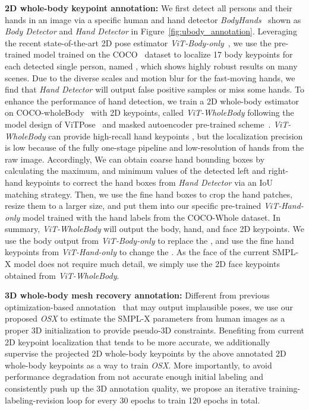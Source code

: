 \documentclass[10pt,twocolumn,letterpaper]{article}
\newcommand{\modelname}{\emph{OSX}\xspace}
\begin{document}
\noindent \textbf{2D whole-body keypoint annotation:} 
We first detect all persons and their hands in an image via a specific human and hand detector \emph{BodyHands}~\cite{narasimhaswamy2022bodyhands} shown as \emph{Body Detector} and \emph{Hand Detector} in Figure~\ref{fig:ubody_annotation}.
Leveraging the recent state-of-the-art 2D pose estimator \emph{ViT-Body-only}~\cite{YufeiXu2022ViTPoseSV}, we use the pre-trained model trained on the COCO~\cite{lin2014coco} dataset to localize 17 body keypoints for each detected single person, named \emph{}, which shows highly robust results on many scenes.
Due to the diverse scales and motion blur for the fast-moving hands, we find that \emph{Hand Detector} will output false positive samples or miss some hands. To enhance the performance of hand detection, 
we train a 2D whole-body estimator on COCO-wholeBody~\cite{jin2020wholebody} with  2D keypoints, called \emph{ViT-WholeBody} following the model design of ViTPose~\cite{YufeiXu2022ViTPoseSV} and masked autoencoder pre-trained scheme~\cite{he2022masked}. \emph{ViT-WholeBody} can provide high-recall hand keypoints \emph{}, but the localization precision is low because of the fully one-stage pipeline and low-resolution of hands from the raw image. Accordingly, We can obtain coarse hand bounding boxes by calculating the maximum, and minimum values of the detected left and right-hand keypoints to correct the hand boxes from \emph{Hand Detector} via an IoU matching strategy.
Then, we use the fine hand boxes to crop the hand patches, resize them to a larger size, and put them into our specific pre-trained \emph{ViT-Hand-only} model trained with the hand labels from the COCO-Whole dataset.
In summary, \emph{ViT-WholeBody} will output the body, hand, and face 2D keypoints. We use the body output from \emph{ViT-Body-only} to replace the \emph{}, and use the fine hand keypoints from \emph{ViT-Hand-only} to change the \emph{}.
As the face of the current SMPL-X model does not require much detail, we simply use the 2D face keypoints \emph{} obtained from \emph{ViT-WholeBody}.


\noindent\textbf{3D whole-body mesh recovery annotation:} 
Different from previous optimization-based annotation~\cite{Pavlakos_2019smplx} that may output implausible poses, we use our proposed \modelname to estimate the SMPL-X parameters from human images as a proper 3D initialization to provide pseudo-3D constraints.
Benefiting from current 2D keypoint localization that tends to be more accurate, we additionally supervise the projected 2D whole-body keypoints by the above annotated 2D whole-body keypoints as a way to train \modelname.
More importantly, to avoid performance degradation from not accurate enough initial labeling and consistently push up the 3D annotation quality, we propose an iterative training-labeling-revision loop for every 30 epochs to train 120 epochs in total. 
\end{document}
